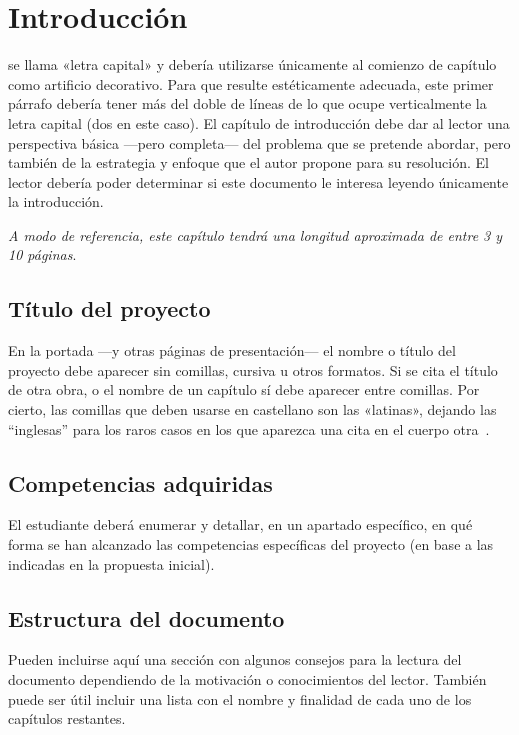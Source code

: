 \chapter{Introducción}

 se llama «letra capital» y debería utilizarse únicamente al
comienzo de capítulo como artificio decorativo. Para que resulte estéticamente
adecuada, este primer párrafo debería tener más del doble de líneas de lo que
ocupe verticalmente la letra capital (dos en este caso). El capítulo de
introducción debe dar al lector una perspectiva básica ---pero completa--- del
problema que se pretende abordar, pero también de la estrategia y enfoque que el
autor propone para su resolución. El lector debería poder determinar si este
documento le interesa leyendo únicamente la introducción.

\emph{A modo de referencia, este capítulo tendrá una longitud aproximada de
  entre 3 y 10 páginas}.


\section{Título del proyecto}

En la portada ---y otras páginas de presentación--- el nombre o título del
proyecto debe aparecer sin comillas, cursiva u otros formatos. Si se cita el
título de otra obra, o el nombre de un capítulo sí debe aparecer entre
comillas. Por cierto, las comillas que deben usarse en castellano son las
«latinas», dejando las ``inglesas'' para los raros casos en los que aparezca una
cita en el cuerpo otra~\cite{sousa}.


\section{Competencias adquiridas}

El estudiante deberá enumerar y detallar, en un apartado específico, en qué
forma se han alcanzado las competencias específicas del proyecto (en base a las
indicadas en la propuesta inicial).


\section{Estructura del documento}

Pueden incluirse aquí una sección con algunos consejos para la lectura del
documento dependiendo de la motivación o conocimientos del lector.  También
puede ser útil incluir una lista con el nombre y finalidad de cada uno de los
capítulos restantes.

